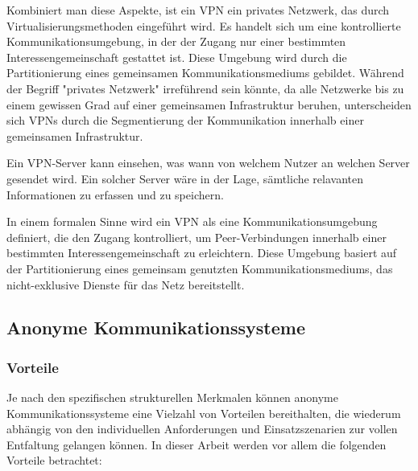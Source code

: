 Kombiniert man diese Aspekte, ist ein VPN ein privates Netzwerk, das durch Virtualisierungsmethoden eingeführt wird. Es handelt sich um eine kontrollierte Kommunikationsumgebung, in der der Zugang nur einer bestimmten Interessengemeinschaft gestattet ist. Diese Umgebung wird durch die Partitionierung eines gemeinsamen Kommunikationsmediums gebildet. Während der Begriff "privates Netzwerk" irreführend sein könnte, da alle Netzwerke bis zu einem gewissen Grad auf einer gemeinsamen Infrastruktur beruhen, unterscheiden sich VPNs durch die Segmentierung der Kommunikation innerhalb einer gemeinsamen Infrastruktur.

Ein VPN-Server kann einsehen, was wann von welchem Nutzer an welchen Server gesendet wird. Ein solcher Server wäre in der Lage, sämtliche relavanten Informationen zu erfassen und zu speichern.

In einem formalen Sinne wird ein VPN als eine Kommunikationsumgebung definiert, die den Zugang kontrolliert, um Peer-Verbindungen innerhalb einer bestimmten Interessengemeinschaft zu erleichtern. Diese Umgebung basiert auf der Partitionierung eines gemeinsam genutzten Kommunikationsmediums, das nicht-exklusive Dienste für das Netz bereitstellt\footnotemark{}.

\subsection{Anonyme Kommunikationssysteme}

\subsubsection{Vorteile}

Je nach den spezifischen strukturellen Merkmalen können anonyme Kommunikationssysteme eine Vielzahl von Vorteilen bereithalten, die wiederum abhängig von den individuellen Anforderungen und Einsatzszenarien zur vollen Entfaltung gelangen können. In dieser Arbeit werden vor allem die folgenden Vorteile betrachtet:

